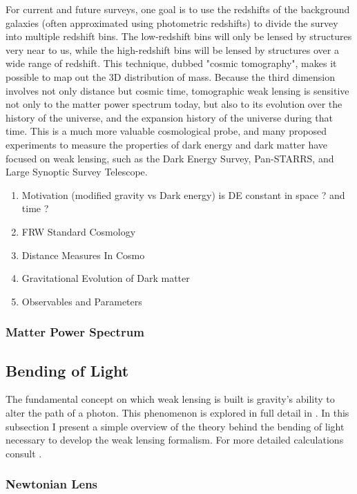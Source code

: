 \par For current and future surveys, one goal is to use the redshifts of the background galaxies (often approximated using photometric redshifts) to divide the survey into multiple redshift bins. The low-redshift bins will only be lensed by structures very near to us, while the high-redshift bins will be lensed by structures over a wide range of redshift. This technique, dubbed "cosmic tomography", makes it possible to map out the 3D distribution of mass. Because the third dimension involves not only distance but cosmic time, tomographic weak lensing is sensitive not only to the matter power spectrum today, but also to its evolution over the history of the universe, and the expansion history of the universe during that time. This is a much more valuable cosmological probe, and many proposed experiments to measure the properties of dark energy and dark matter have focused on weak lensing, such as the Dark Energy Survey, Pan-STARRS, and Large Synoptic Survey Telescope. 

\begin{enumerate}
  \item Motivation (modified gravity vs Dark energy) is DE constant in space ? and time ?
  \item FRW Standard Cosmology 
  \item Distance Measures In Cosmo
  \item Gravitational Evolution of Dark matter
  \item Observables and Parameters
\end{enumerate}
\subsubsection{Matter Power Spectrum}
\cite{extragalactic}

\subsection{Bending of Light}
The fundamental concept on which weak lensing is built is gravity's ability to alter the path of a photon. This phenomenon is explored in full detail in \cite{GR1,basicLens,Mellier:1998pk}.
In this subsection I present a simple overview of the theory behind the bending of light necessary to develop the weak lensing formalism. For more detailed calculations consult \cite{GR1,basicLens,Mellier:1998pk}.
\subsubsection{Newtonian Lens}
\label{subsec:newtonlens}

